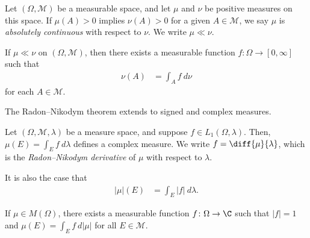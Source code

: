 \begin{definition}
  Let $\left(\Omega,\mathcal{M}\right)$ be a measurable space, and let $\mu$ and $\nu$ be positive measures on this space. If $\mu(A) > 0$ implies $\nu(A) > 0$ for a given $A\in \mathcal{M}$, we say $\mu$ is \textit{absolutely continuous} with respect to $\nu$. We write $\mu \ll \nu$.
\end{definition}
\begin{theorem}
  If $\mu \ll \nu$ on $\left(\Omega,\mathcal{M}\right)$, then there exists a measurable function $f\colon \Omega\rightarrow [0,\infty]$ such that
  \begin{align*}
    \nu(A) &= \int_{A}^{} f \:d\nu
  \end{align*}
  for each $A\in \mathcal{M}$.
\end{theorem}
\begin{remark}
The Radon--Nikodym theorem extends to signed and complex measures.
\end{remark}
\begin{fact}
  Let $\left(\Omega,\mathcal{M},\lambda\right)$ be a measure space, and suppose $f\in L_{1}\left(\Omega,\lambda\right)$. Then, $\mu\left(E\right) = \int_{E}^{} f\:d\lambda$ defines a complex measure. We write $f = \diff{\mu}{\lambda}$, which is the \textit{Radon--Nikodym derivative} of $\mu$ with respect to $\lambda$.\newline

  It is also the case that
  \begin{align*}
    \left\vert \mu \right\vert\left(E\right) &= \int_{E}^{} \left\vert f \right\vert\:d\lambda.
  \end{align*}
\end{fact}
\begin{fact}
  If $\mu\in M\left(\Omega\right)$, there exists a measurable function $f\colon \Omega\rightarrow \C$ such that $\left\vert f \right\vert = 1$ and $\mu\left(E\right) = \int_{E}^{} f\:d\left\vert \mu \right\vert$ for all $E\in \mathcal{M}$.
\end{fact}
